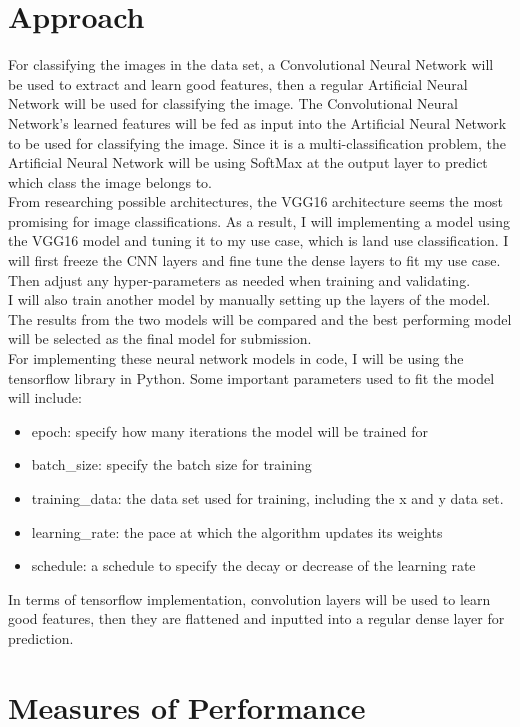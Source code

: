 \documentclass[acmtog]{acmart}
\begin{document}
	\section{Approach}
	
	For classifying the images in the data set, a Convolutional Neural Network will be used to extract and learn good features, then a regular Artificial Neural Network will be used for classifying the image. The Convolutional Neural Network's learned features will be fed as input into the Artificial Neural Network to be used for classifying the image. Since it is a multi-classification problem, the Artificial Neural Network will be using SoftMax at the output layer to predict which class the image belongs to.\\
	From researching possible architectures, the VGG16 architecture seems the most promising for image classifications. As a result, I will implementing a model using the VGG16 model and tuning it to my use case, which is land use classification. I will first freeze the CNN layers and fine tune the dense layers to fit my use case. Then adjust any hyper-parameters as needed when training and validating.\\
	I will also train another model by manually setting up the layers of the model. The results from the two models will be compared and the best performing model will be selected as the final model for submission.\\
	For implementing these neural network models in code, I will be using the tensorflow library in Python. 
	Some important parameters used to fit the model will include:
	\begin{itemize}
		\item epoch: specify how many iterations the model will be trained for
		\item batch\_size: specify the batch size for training
		\item training\_data: the data set used for training, including the x and y data set.
		\item learning\_rate: the pace at which the algorithm updates its weights
		\item schedule: a schedule to specify the decay or decrease of the learning rate
	\end{itemize}
	
	In terms of tensorflow implementation, convolution layers will be used to learn good features, then they are flattened and inputted into a regular dense layer for prediction.
	
	
	\section{Measures of Performance}
	
\end{document}

